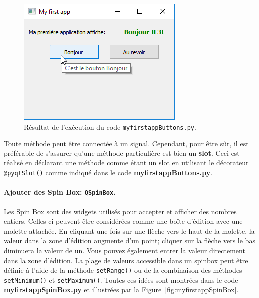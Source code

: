 \documentclass[%
oneside,                 %
final,                   %
10pt,french]{article}
\begin{document}
\begin{figure}[!ht]  %
  \centerline{\includegraphics[width=0.7\linewidth]{imgs/myfirstappButtons1.png}}
  \caption{
  Résultat de l'exécution du code \texttt{myfirstappButtons.py}. \label{fig:myfirstappButtons}
  }
\end{figure}


Toute méthode peut être connectée à un signal. Cependant, pour être sûr, il est préférable de s’assurer qu’une méthode particulière est bien un \textbf{slot}. Ceci est réalisé en déclarant une méthode comme étant un slot en utilisant le décorateur \texttt{@pyqtSlot()} comme indiqué dans le code \textbf{myfirstappButtons.py}.

\paragraph{Ajouter des Spin Box: \texttt{QSpinBox}.}
Les Spin Box sont des widgets utilisés pour accepter et afficher des nombres entiers. Celles-ci peuvent être considérées comme une boîte d'édition avec une molette attachée. En cliquant une fois sur une flèche vers le haut de la molette, la valeur dans la zone d'édition augmente d'un point; cliquer sur la flèche vers le bas diminuera la valeur de un. Vous pouvez également entrer la valeur directement dans la zone d'édition. La plage de valeurs accessible dans un spinbox peut être définie à l'aide de la méthode \texttt{setRange()} ou de la combinaison des méthodes \texttt{setMinimum()} et \texttt{setMaximum()}. Toutes ces idées sont montrées dans le code \textbf{myfirstappSpinBox.py} et illustrées par la Figure~\ref{fig:myfirstappSpinBox}.
\end{document}
